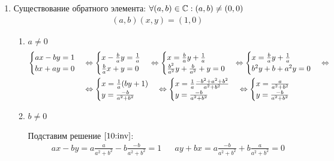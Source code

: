 \documentclass{article}
\begin{document}
\begin{enumerate}
	\item{}Существование обратного элемента: $\forall (a,b)\in\mathbb{C}:(a,b)\neq(0,0)$
	\begin{align*}
		(a,b)(x,y)=(1,0)
	\end{align*}
	\begin{enumerate}
		\item{}$a\neq 0$
		\begin{align}
			\notag
			\begin{cases}
				ax-by=1 \\
				bx+ay=0
			\end{cases}
			 & \Leftrightarrow
			\begin{cases}
				x-\frac{b}{a}y=\frac{1}{a} \\
				\frac{b}{a}x+y=0
			\end{cases}
			\Leftrightarrow
			\begin{cases}
				x=\frac{b}{a}y+\frac{1}{a} \\
				\frac{b^{2}}{a^{2}}y+\frac{b}{a^{2}}+y=0
			\end{cases}
			\Leftrightarrow
			\begin{cases}
				x=\frac{b}{a}y+\frac{1}{a} \\
				b^{2}y+b+a^{2}y=0
			\end{cases}
			\Leftrightarrow    \\
			 & \Leftrightarrow
			\begin{cases}
				x=\frac{1}{a}(by+1) \\
				y=\frac{-b}{a^{2}+b^{2}}
			\end{cases}
			\Leftrightarrow
			\begin{cases}
				x=\frac{1}{a}\frac{-b^{2}+a^{2}+b^{2}}{a^{2}+b^{2}} \\
				y=\frac{-b}{a^{2}+b^{2}}
			\end{cases}
			\Leftrightarrow
			\begin{cases}
				x=\frac{a}{a^{2}+b^{2}} \\
				y=\frac{-b}{a^{2}+b^{2}}
			\end{cases}\label{10:inv}
		\end{align}
		\item{}$b\neq 0$

		Подставим решение $\eqref{10:inv}$:
		\begin{align*}
			 & ax-by=a\frac{a}{a^{2}+b^{2}}-b\frac{-b}{a^{2}+b^{2}}=1 &  & ay+bx=a\frac{-b}{a^{2}+b^{2}}+b\frac{a}{a^{2}+b^{2}}=0
		\end{align*}
	\end{enumerate}


\end{enumerate}
\end{document}
